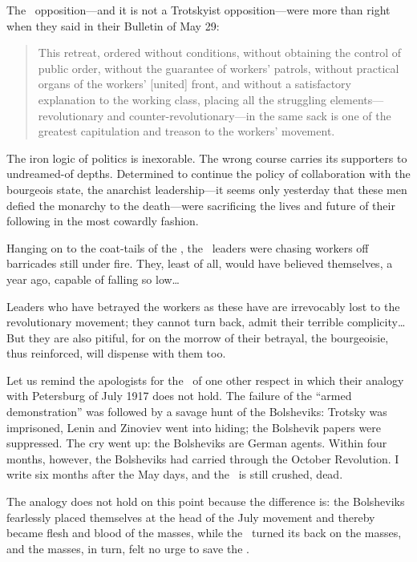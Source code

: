 The \POUM\ opposition---and it is not a Trotskyist opposition---were more than right when they said in their Bulletin of May 29:

\begin{quotation}
  This retreat, ordered without conditions, without obtaining the control of public order, without the guarantee of workers’ patrols, without practical organs of the workers’ [united] front, and without a satisfactory explanation to the working class, placing all the struggling elements---revolutionary and counter-revolutionary---in the same sack is one of the greatest capitulation and treason to the workers’ movement.
\end{quotation}

The iron logic of politics is inexorable. The wrong course carries its supporters to undreamed-of depths. Determined to continue the policy of collaboration with the bourgeois state, the anarchist leadership---it seems only yesterday that these men defied the monarchy to the death---were sacrificing the lives and future of their following in the most cowardly fashion.

Hanging on to the coat-tails of the \CNT, the \POUM\ leaders were chasing workers off barricades still under fire. They, least of all, would have believed themselves, a year ago, capable of falling so low\dots

Leaders who have betrayed the workers as these have are irrevocably lost to the revolutionary movement; they cannot turn back, admit their terrible complicity\dots But they are also pitiful, for on the morrow of their betrayal, the bourgeoisie, thus reinforced, will dispense with them too.

Let us remind the apologists for the \POUM\ of one other respect in which their analogy with Petersburg of July 1917 does not hold. The failure of the ``armed demonstration'' was followed by a savage hunt of the Bolsheviks: Trotsky was imprisoned, Lenin and Zinoviev went into hiding; the Bolshevik papers were suppressed. The cry went up: the Bolsheviks are German agents. Within four months, however, the Bolsheviks had carried through the October Revolution. I write six months after the May days, and the \POUM\ is still crushed, dead. 

The analogy does not hold on this point because the difference is: the Bolsheviks fearlessly placed themselves at the head of the July movement and thereby became flesh and blood of the masses, while the \POUM\ turned its back on the masses, and the masses, in turn, felt no urge to save the \POUM.